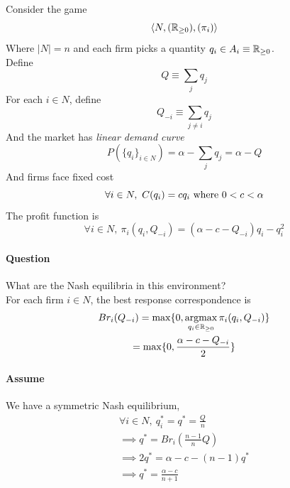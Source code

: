\documentclass[11pt]{article}
\begin{document}
	\begin{example}
		Consider the game 
		\begin{equation}
			\langle N, (\mathbb{R}_{\geq 0}), (\pi_i) \rangle
		\end{equation}
		Where $|N| = n$ and each firm picks a quantity $q_i \in A_i \equiv \mathbb{R}_{\geq 0}$. \\
		Define 
		\begin{equation}
			Q \equiv \sum_j q_j
		\end{equation}
		For each $i \in N$, define 
		\begin{equation}
			Q_{-i} \equiv \sum_{j\neq i} q_j
		\end{equation}
		And the market has \emph{linear demand curve}
		\begin{equation}
			P(\{q_i\}_{i\in N}) = \alpha - \sum_{j}q_j = \alpha - Q
		\end{equation}
		And firms face fixed cost
		\begin{equation}
			\forall i \in N,\ C(q_i) = c q_i \tx{ where } 0 < c < \alpha
		\end{equation}
		The profit function is
		\begin{equation}
			\forall i \in N,\ \pi_i(q_i, Q_{-i}) = (\alpha - c - Q_{-i})q_i - q_i^2
		\end{equation}
		\paragraph{Question}What are the Nash equilibria in this environment? \\
		For each firm $i \in N$, the best response correspondence is
		\begin{gather}
			Br_i(Q_{-i}) = \max\{0, \operatorname*{argmax}_{q_i \in \mathbb{R}_{\geq0}} \pi_{i}(q_i, Q_{-i}) \} \\
			= \max\{0, \frac{\alpha - c - Q_{-i}}{2}\}
		\end{gather}
		\paragraph{Assume}We have a symmetric Nash equilibrium, 
		\begin{gather}
			\forall i \in N,\ q^*_i = q^* = \frac{Q}{n} \\
			\implies q^* = Br_i(\frac{n-1}{n}Q) \\
			\implies 2 q^* = \alpha - c - (n-1) q^* \\
			\implies q^* = \frac{\alpha - c}{n + 1}
		\end{gather}

\end{example}
\end{document}
